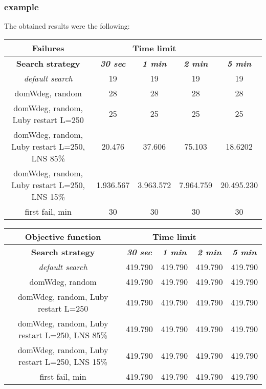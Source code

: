 \subsubsection{example}
The obtained results were the following:
{
\renewcommand{\arraystretch}{2}
\begin{longtable}[h]{| c | c | c | c | c |}
    \hline
    \textbf{Failures} & \multicolumn{3}{c}{Time limit} & \\
    \hline
    \textbf{Search strategy} & \textbf{\textit{30 sec}} & \textbf{\textit{1 min}} & \textbf{\textit{2 min}} & \textbf{\textit{5 min}} \\
    \hline
    \endhead
    \textit{default search}                       &      19 &      19 &      19 &       19 \\
    \hline
    domWdeg, random                               &      28 &      28 &      28 &       28 \\
    \hline
    domWdeg, random, Luby restart L=250           &      25 &      25 &      25 &       25 \\
    \hline
    domWdeg, random, Luby restart L=250, LNS 85\% &   20.476 &   37.606 &   75.103 &   18.6202 \\
    \hline
    domWdeg, random, Luby restart L=250, LNS 15\% & 1.936.567 & 3.963.572 & 7.964.759 & 20.495.230 \\
    \hline
    first fail, min                               &      30 &      30 &      30 &       30 \\
    \hline
\end{longtable}
}

{
\renewcommand{\arraystretch}{2}
\begin{longtable}[h]{| c | c | c | c | c |}
    \hline
    \textbf{Objective function} & \multicolumn{3}{c}{Time limit} & \\
    \hline
    \textbf{Search strategy} & \textbf{\textit{30 sec}} & \textbf{\textit{1 min}} & \textbf{\textit{2 min}} & \textbf{\textit{5 min}} \\
    \hline
    \endhead
    \textit{default search}                       & 419.790 & 419.790 & 419.790 & 419.790 \\
    \hline
    domWdeg, random                               & 419.790 & 419.790 & 419.790 & 419.790 \\
    \hline
    domWdeg, random, Luby restart L=250           & 419.790 & 419.790 & 419.790 & 419.790 \\
    \hline
    domWdeg, random, Luby restart L=250, LNS 85\% & 419.790 & 419.790 & 419.790 & 419.790 \\
    \hline
    domWdeg, random, Luby restart L=250, LNS 15\% & 419.790 & 419.790 & 419.790 & 419.790 \\
    \hline
    first fail, min                               & 419.790 & 419.790 & 419.790 & 419.790 \\
    \hline
\end{longtable}
}
